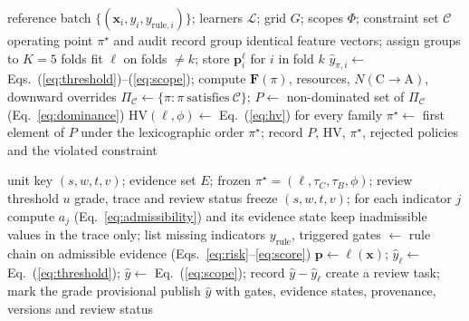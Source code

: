 \documentclass[journal]{IEEEtran}
\begin{document}
\begin{algorithm}[t]
\caption{Offline calibration and policy selection}
\label{alg:offline}
\begin{algorithmic}[1]
\Require reference batch $\{(\mathbf x_i,y_i,y_{\mathrm{rule},i})\}$; learners $\mathcal L$; grid $G$; scopes $\Phi$; constraint set $\mathcal C$
\Ensure operating point $\pi^\star$ and audit record
\State group identical feature vectors; assign groups to $K=5$ folds
  \State fit $\ell$ on folds $\neq k$; store $\mathbf p^{\ell}_i$ for $i$ in fold $k$
\EndFor
{}
  \State $\hat y_{\pi,i}\gets$ Eqs.~(\ref{eq:threshold})--(\ref{eq:scope}); compute $\mathbf F(\pi)$, resources, $N(\mathrm{C}\rightarrow\mathrm{A})$, downward overrides
\EndFor
\State $\Pi_{\mathcal C}\gets\{\pi:\pi\ \text{satisfies}\ \mathcal C\}$; $P\gets$ non-dominated set of $\Pi_{\mathcal C}$ (Eq.~\ref{eq:dominance})
\State $\mathrm{HV}(\ell,\phi)\gets$ Eq.~(\ref{eq:hv}) for every family
\State $\pi^\star\gets$ first element of $P$ under the lexicographic order
\State \Return $\pi^\star$; record $P$, HV, $\pi^\star$, rejected policies and the violated constraint
\end{algorithmic}
\end{algorithm}

\begin{algorithm}[t]
\caption{Online grading of an evaluation unit}
\label{alg:online}
\begin{algorithmic}[1]
\Require unit key $(s,w,t,v)$; evidence set $E$; frozen $\pi^\star=(\ell,\tau_C,\tau_B,\phi)$; review threshold $u$
\Ensure grade, trace and review status
\State freeze $(s,w,t,v)$; for each indicator $j$ compute $a_j$ (Eq.~\ref{eq:admissibility}) and its evidence state
\State keep inadmissible values in the trace only; list missing indicators
\State $y_{\mathrm{rule}}$, triggered gates $\gets$ rule chain on admissible evidence (Eqs.~\ref{eq:risk}--\ref{eq:score})
\State $\mathbf p\gets\ell(\mathbf x)$; $\hat y_\ell\gets$ Eq.~(\ref{eq:threshold}); $\hat y\gets$ Eq.~(\ref{eq:scope}); record $\hat y-\hat y_\ell$
  \State create a review task; mark the grade provisional
\EndIf
\State publish $\hat y$ with gates, evidence states, provenance, versions and review status
\end{algorithmic}
\end{algorithm}
\end{document}
